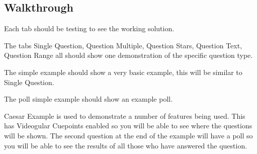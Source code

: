 \documentclass[12pt,a4paper]{article}
\begin{document}
\subsection{Walkthrough}

Each tab should be testing to see the working solution.

The tabs Single Question, Question Multiple, Question Stars, Question Text, Question Range all should show one demonstration of the specific question type.

The simple example should show a very basic example, this will be similar to Single Question.

The poll simple example should show an example poll.

Caesar Example is used to demonstrate a number of features being used. This has Videogular Cuepoints enabled so you will be able to see where the questions will be shown. The second question at the end of the example will have a poll so you will be able to see the results of all those who have answered the question.
\end{document}
